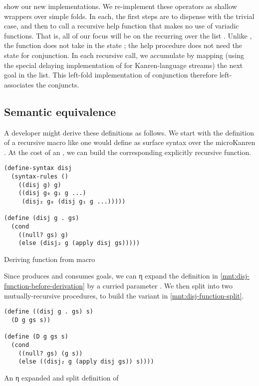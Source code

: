\documentclass[sigplan,draft,balance,pbalance,natbib=false]{acmart}
\begin{document}
 show our
new implementations. We re-implement these operators as shallow
wrappers over simple folds. In each, the first steps are to dispense
with the trivial case, and then to call a recursive help function that
makes no use of variadic functions. That is, all of our focus will be
on the recurring over the list . Unlike ,
the function  does not take in the state ;
the help procedure does not need the state for conjunction. In each
recursive call, we accumulate by mapping (using the special delaying
implementation of  for Kanren-language
streams) the next goal in the list. This left-fold implementation of
conjunction therefore left-associates the conjuncts.

\subsection{Semantic equivalence}

A developer might derive these definitions as follows. We start with
the definition of a recursive  macro like one would
define as surface syntax over the microKanren . At
the cost of an , we can build the corresponding
explicitly recursive  function.

\begin{listing}[h]
\begin{verbatim}
(define-syntax disj
  (syntax-rules ()
    ((disj g) g)
    ((disj g₀ g₁ g ...)
     (disj₂ g₀ (disj g₁ g ...)))))

(define (disj g . gs)
  (cond
    ((null? gs) g)
    (else (disj₂ g (apply disj gs)))))
\end{verbatim}
  \caption{Deriving  function from macro}
  \label{mnt:disj-function-before-derivation}
\end{listing}

\noindent Since  produces and consumes goals, we can
η expand the definition in \cref{mnt:disj-function-before-derivation}
by a curried parameter . We then split 
into two mutually-recursive procedures, to build the variant in
\cref{mnt:disj-function-split}.

\begin{listing}[h]
\begin{verbatim}
(define ((disj g . gs) s)
  (D g gs s))

(define (D g gs s)
  (cond
    ((null? gs) (g s))
    (else ((disj₂ g (apply disj gs)) s))))
\end{verbatim}
  \caption{An η expanded and split definition of }
  \label{mnt:disj-function-split}
\end{listing}
\end{document}
